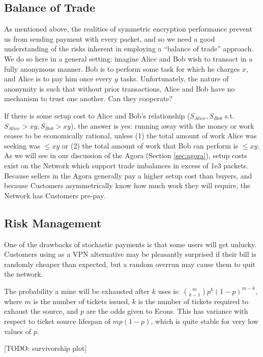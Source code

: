 \subsection{Balance of Trade}
\label{tokens-bot}

As mentioned above, the realities of symmetric encryption performance prevent us from sending payment with every packet, and so we need a good understanding of the risks inherent in employing a ``balance of trade'' approach. We do so here in a general setting: imagine Alice and Bob wish to transact in a fully anonymous manner. Bob is to perform some task for which he charges $x$, and Alice is to pay him once every $y$ tasks. Unfortunately, the nature of anonymity is such that without prior transactions, Alice and Bob have no mechanism to trust one another. Can they cooperate?

If there is some setup cost to Alice and Bob's relationship ($S_{Alice}, S_{Bob}$ s.t. $S_{Alice} > xy, S_{Bob} > xy$), the answer is yes: running away with the money or work ceases to be economically rational, unless (1) the total amount of work Alice was seeking was $\leq xy$ or (2) the total amount of work that Bob can perform is $\leq xy$. As we will see in our discussion of the Agora (Section \ref{sec:agora}), setup costs exist on the \Orchid{} Network which support trade imbalances in excess of 1e3 packets. Because sellers in the Agora generally pay a higher setup cost than buyers, and because Customers asymmetrically know how much work they will require, the \Orchid{} Network has Customers pre-pay.

\subsection{Risk Management}

One of the drawbacks of stochastic payments is that some users will
get unlucky. Customers using \Orchid{} as a VPN alternative may be
pleasantly surprised if their bill is randomly cheaper than expected,
but a random overrun may cause them to quit the network.

The probability a mine will be exhausted after $k$ uses is:
$\binom{m}{k-1} p^{k} (1-p)^{m-k}$, where $m$ is the number of tickets
issued, $k$ is the number of tickets required to exhaust the source,
and $p$ are the odds given to Econs. This has variance with respect to
ticket source lifespan of $m p (1-p)$, which is quite stable for very
low values of $p$.

[TODO: survivorship plot]

